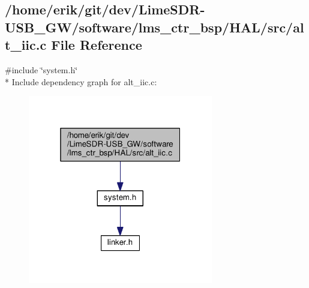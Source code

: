 \subsection{/home/erik/git/dev/\+Lime\+S\+D\+R-\/\+U\+S\+B\+\_\+\+G\+W/software/lms\+\_\+ctr\+\_\+bsp/\+H\+A\+L/src/alt\+\_\+iic.c File Reference}
\label{alt__iic_8c}
{\ttfamily \#include \char`\"{}system.\+h\char`\"{}}\\*
Include dependency graph for alt\+\_\+iic.\+c\+:
\nopagebreak
\begin{figure}[H]
\begin{center}
\leavevmode
\includegraphics[width=229pt]{dc/dfc/alt__iic_8c__incl}
\end{center}
\end{figure}
